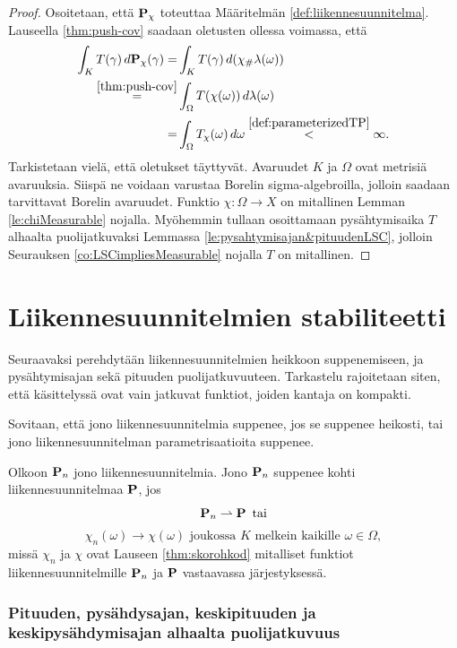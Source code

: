 \documentclass[12pt,oneside,a4paper]{amsbook} %
\begin{document}
\begin{proof}
Osoitetaan, että $\P_\chi$ toteuttaa Määritelmän \ref{def:liikennesuunnitelma}. Lauseella \ref{thm:push-cov} saadaan oletusten ollessa voimassa, että
\begin{align*}
    \int_K T(\gamma)\, d\P_\chi(\gamma) =& \int_K T(\gamma) \, d(\chi_\# \lambda(\omega)) \\
    \stackrel{\ref{thm:push-cov}}{=}& \int_\Omega T(\chi(\omega)) \, d\lambda(\omega) \\
    =& \int_\Omega T_\chi(\omega) \, d\omega \stackrel{\ref{def:parameterizedTP}}{<} \infty.
\end{align*}
Tarkistetaan vielä, että oletukset täyttyvät. Avaruudet $K$ ja $\Omega$ ovat metrisiä avaruuksia. Siispä ne voidaan varustaa Borelin sigma-algebroilla, jolloin saadaan tarvittavat Borelin avaruudet. Funktio $\chi:\Omega \to X$ on mitallinen Lemman \ref{le:chiMeasurable} nojalla. Myöhemmin tullaan osoittamaan pysähtymisaika $T$ alhaalta puolijatkuvaksi Lemmassa \ref{le:pysahtymisajan&pituudenLSC}, jolloin Seurauksen \ref{co:LSCimpliesMeasurable} nojalla $T$ on mitallinen. 
\end{proof}



\section{Liikennesuunnitelmien {stabiliteetti}}
Seuraavaksi perehdytään liikennesuunnitelmien heikkoon suppenemiseen, ja pysähtymisajan sekä pituuden puolijatkuvuuteen. Tarkastelu rajoitetaan siten, että käsittelyssä ovat vain jatkuvat funktiot, joiden kantaja on kompakti.

Sovitaan, että jono liikennesuunnitelmia suppenee, jos se suppenee heikosti, tai jono liikennesuunnitelman parametrisaatioita suppenee.

\begin{definition}
    Olkoon $\P_n$ jono liikennesuunnitelmia. Jono $\P_n$ suppenee kohti liikennesuunnitelmaa $\P$, jos 
    $$\P_n \rightharpoonup \P \, \text{ tai}$$
    $$ \chi_n (\omega) \to  \chi (\omega) \text{ joukossa } K \text{ melkein kaikille } \omega
    \in \Omega,$$
    missä $ \chi_n$ ja $ \chi$ ovat Lauseen \ref{thm:skorohkod} mitalliset funktiot liikennesuunnitelmille $\P_n$ ja $\P$ vastaavassa järjestyksessä.
\end{definition}

\subsubsection{Pituuden, pysähdysajan, keskipituuden ja keskipysähdymisajan alhaalta puolijatkuvuus}
\end{document}
